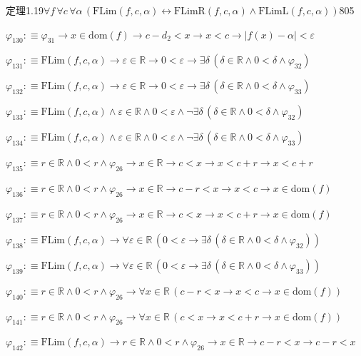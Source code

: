 \begin{fullproof}{定理1.19}{$\forall f\,\forall c\,\forall \alpha\,(\mathrm{FLim}(f,c,\alpha) \leftrightarrow \mathrm{FLimR}(f,c,\alpha) \land \mathrm{FLimL}(f,c,\alpha))$}{805}
\begin{abbrevlist}
\item $\varphi_{130} :\equiv \varphi_{31} \to x \in \mathrm{dom}(f) \to c - d_{2} < x \to x < c \to \lvert f(x) - \alpha \rvert < \varepsilon$
\item $\varphi_{131} :\equiv \mathrm{FLim}(f,c,\alpha) \to \varepsilon \in \mathbb{R} \to 0 < \varepsilon \to \exists \delta\,(\delta \in \mathbb{R} \land 0 < \delta \land \varphi_{32})$
\item $\varphi_{132} :\equiv \mathrm{FLim}(f,c,\alpha) \to \varepsilon \in \mathbb{R} \to 0 < \varepsilon \to \exists \delta\,(\delta \in \mathbb{R} \land 0 < \delta \land \varphi_{33})$
\item $\varphi_{133} :\equiv \mathrm{FLim}(f,c,\alpha) \land \varepsilon \in \mathbb{R} \land 0 < \varepsilon \land \neg \exists \delta\,(\delta \in \mathbb{R} \land 0 < \delta \land \varphi_{32})$
\item $\varphi_{134} :\equiv \mathrm{FLim}(f,c,\alpha) \land \varepsilon \in \mathbb{R} \land 0 < \varepsilon \land \neg \exists \delta\,(\delta \in \mathbb{R} \land 0 < \delta \land \varphi_{33})$
\item $\varphi_{135} :\equiv r \in \mathbb{R} \land 0 < r \land \varphi_{26} \to x \in \mathbb{R} \to c < x \to x < c + r \to x < c + r$
\item $\varphi_{136} :\equiv r \in \mathbb{R} \land 0 < r \land \varphi_{26} \to x \in \mathbb{R} \to c - r < x \to x < c \to x \in \mathrm{dom}(f)$
\item $\varphi_{137} :\equiv r \in \mathbb{R} \land 0 < r \land \varphi_{26} \to x \in \mathbb{R} \to c < x \to x < c + r \to x \in \mathrm{dom}(f)$
\item $\varphi_{138} :\equiv \mathrm{FLim}(f,c,\alpha) \to \forall \varepsilon \in \mathbb{R}\,(0 < \varepsilon \to \exists \delta\,(\delta \in \mathbb{R} \land 0 < \delta \land \varphi_{32}))$
\item $\varphi_{139} :\equiv \mathrm{FLim}(f,c,\alpha) \to \forall \varepsilon \in \mathbb{R}\,(0 < \varepsilon \to \exists \delta\,(\delta \in \mathbb{R} \land 0 < \delta \land \varphi_{33}))$
\item $\varphi_{140} :\equiv r \in \mathbb{R} \land 0 < r \land \varphi_{26} \to \forall x \in \mathbb{R}\,(c - r < x \to x < c \to x \in \mathrm{dom}(f))$
\item $\varphi_{141} :\equiv r \in \mathbb{R} \land 0 < r \land \varphi_{26} \to \forall x \in \mathbb{R}\,(c < x \to x < c + r \to x \in \mathrm{dom}(f))$
\item $\varphi_{142} :\equiv \mathrm{FLim}(f,c,\alpha) \to r \in \mathbb{R} \land 0 < r \land \varphi_{26} \to x \in \mathbb{R} \to c - r < x \to c - r < x$

\end{abbrevlist}
\end{fullproof}
